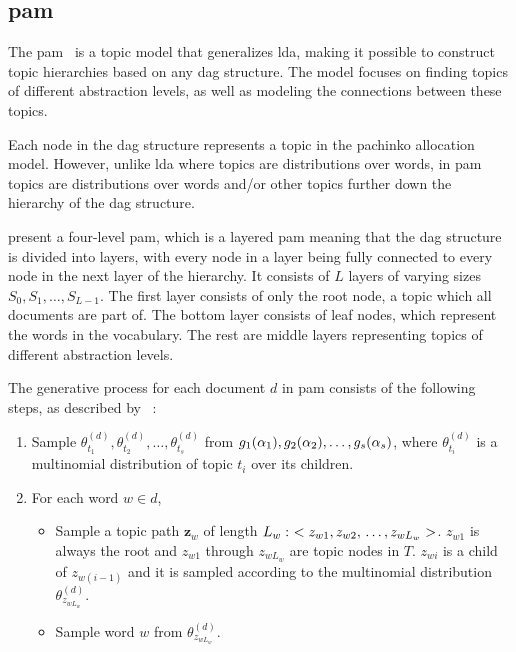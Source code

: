 \subsection{\acrlong{pam}}\label{subsec:pachinko_prelim}
The \acrfull{pam}~\cite{li2006pachinko} is a topic model that generalizes \gls{lda}, making it possible to construct topic hierarchies based on any \gls{dag} structure.
The model focuses on finding topics of different abstraction levels, as well as modeling the connections between these topics.

Each node in the \gls{dag} structure represents a topic in the pachinko allocation model. 
However, unlike \gls{lda} where topics are distributions over words, in \gls{pam} topics are distributions over words and/or other topics further down the hierarchy of the \gls{dag} structure.

\citet{li2006pachinko} present a four-level \gls{pam}, which is a layered \gls{pam} meaning that the \gls{dag} structure is divided into layers, with every node in a layer being fully connected to every node in the next layer of the hierarchy.
It consists of $L$ layers of varying sizes $S_0, S_1, \dots, S_{L-1}$.
The first layer consists of only the root node, a topic which all documents are part of.
The bottom layer consists of leaf nodes, which represent the words in the vocabulary.
The rest are middle layers representing topics of different abstraction levels.

The generative process for each document $d$ in \gls{pam} consists of the following steps, as described by \citeauthor{li2006pachinko}~\cite{li2006pachinko}:
\begin{enumerate}
	\item Sample $\theta_{t_1}^{(d)}, \theta_{t_2}^{(d)}, \dots, \theta_{t_s}^{(d)}$ from  $g_1(\alpha_1), g_2(\alpha_2), \dots, \newline g_s(\alpha_s)$, where $\theta_{t_i}^{(d)}$ is a multinomial distribution of topic $t_i$ over its children.
	\item For each word $w \in d$,
	\begin{itemize}
		\item Sample a topic path $\mathbf{z}_w$ of length $L_w:~< z_{w1}, z_{w2},\newline \dots, z_{wL_w} >$. $z_{w1}$ is always the root and $z_{w1}$ through $z_{wL_w}$ are topic nodes in $T$. $z_{wi}$ is a child of $z_{w(i-1)}$ and it is sampled according to the multinomial distribution $\theta_{z_{wL_w}}^{(d)}$.
		\item Sample word $w$ from $\theta_{z_{wL_w}}^{(d)}$.
	\end{itemize}
\end{enumerate}

